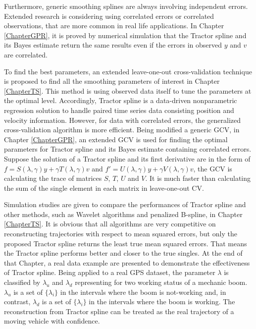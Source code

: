 Furthermore, generic smoothing splines are always involving independent errors. Extended research is considering using correlated errors or correlated observations, that are more common in real life applications. In Chapter \ref{ChapterGPR}, it is proved by numerical simulation that the Tractor spline and its Bayes estimate return the same results even if the errors in observed $y$ and $v$ are correlated.  

To find the best parameters, an extended leave-one-out cross-validation technique is proposed to find all the smoothing parameters of interest in Chapter \ref{ChapterTS}. This method is using observed data itself to tune the parameters at the optimal level. Accordingly, Tractor spline is a data-driven nonparametric regression solution to handle paired time series data consisting position and velocity information. However, for data with correlated errors, the generalized cross-validation algorithm is more efficient. Being modified a generic GCV, in Chapter \ref{ChapterGPR}, an extended GCV is used for finding the optimal parameters for Tractor spline and its Bayes estimate containing correlated errors. Suppose the solution of a Tractor spline and its first derivative are in the form of $f=S(\lambda,\gamma)y+\gamma T(\lambda,\gamma)v$ and $f'=U(\lambda,\gamma)y+\gamma V(\lambda,\gamma)v$, the GCV is calculating the trace of matrices $S$, $T$, $U$ and $V$. It is much faster than calculating the sum of the single element in each matrix in leave-one-out CV. 

Simulation studies are given to compare the performances of Tractor spline and other methods, such as Wavelet algorithms and penalized B-spline, in Chapter \ref{ChapterTS}. It is obvious that all algorithms are very competitive on reconstructing trajectories with respect to mean squared errors, but only the proposed Tractor spline returns the least true mean squared errors. That means the Tractor spline performs better and closer to the true singles. At the end of that Chapter, a real data example are presented to demonstrate the effectiveness of Tractor spline. Being applied to a real GPS dataset, the parameter $\lambda$ is classified by $\lambda_u$ and $\lambda_d$ representing for two working status of a mechanic boom. $\lambda_u$ is a set of $\{\lambda_i\}$ in the intervals where the boom is not-working and, in contrast, $\lambda_d$ is a set of $\{\lambda_i\}$ in the intervals where the boom is working. The reconstruction from Tractor spline can be treated as the real trajectory of a moving vehicle with confidence. 

